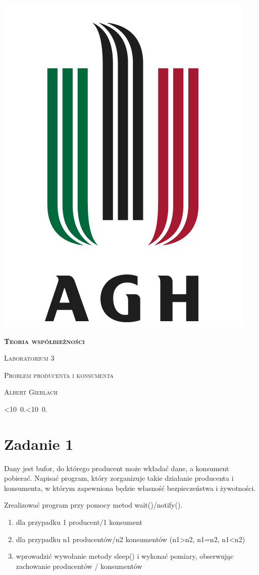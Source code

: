 \documentclass[12pt]{article}
\def\mydate{\leavevmode\hbox{\twodigits\day.\twodigits\month.\the\year}}
\def\twodigits#1{\ifnum#1<10 0\fi\the#1}
\begin{document}
\thispagestyle{empty}
\begin{center}
\begin{minipage}{0.75\linewidth}
    \centering
    \includegraphics[width=0.45\linewidth]{agh_logo2.png}
    \par
    \vspace{2cm}
    {\bfseries{\scshape{\Huge  Teoria współbieżności}}}
    \par
    \vspace{2cm}
    {\scshape{\Large Laboratorium 3}}
    \par
    \vspace{0.4cm}
    {\scshape{\Large Problem producenta i konsumenta}}
    \par
    \vspace{3cm}

    {\scshape{\Large Albert Gierlach}}\par
    \vspace{1cm}

    {\Large \mydate}
\end{minipage}
\end{center}
\clearpage



\section{Zadanie 1}
Dany jest bufor, do którego producent może wkładać dane, a konsument pobierać. Napisać program, który zorganizuje takie działanie producenta i konsumenta, w którym zapewniona będzie własność bezpieczeństwa i żywotności.

Zrealizować program przy pomocy metod wait()/notify().
\begin{enumerate}[label=\alph*.]
    \item dla przypadku 1 producent/1 konsument
    \item dla przypadku n1 producentów/n2 konsumentów (n1>n2, n1=n2, n1<n2)
    \item wprowadzić wywołanie metody sleep() i wykonać pomiary, obserwując zachowanie producentów / konsumentów
\end{enumerate}
\end{document}
